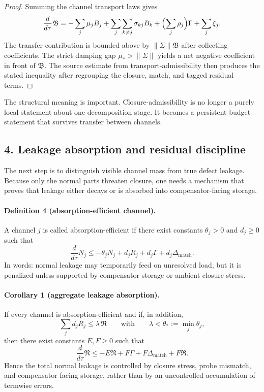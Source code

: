 \begin{proof}
Summing the channel transport laws gives
\[
\frac{d}{d\tau}\mathfrak B
= -\sum_j \mu_j B_j + \sum_j\sum_{k\neq j}\sigma_{kj}B_k
+ \Bigl(\sum_j \rho_j\Bigr)\Gamma + \sum_j \xi_j.
\]
The transfer contribution is bounded above by $\|\Sigma\|\mathfrak B$ after
collecting coefficients. The strict damping gap $\mu_*>\|\Sigma\|$ yields a net
negative coefficient in front of $\mathfrak B$. The source estimate from
transport-admissibility then produces the stated inequality after regrouping the
closure, match, and tagged residual terms.
\end{proof}

The structural meaning is important. Closure-admissibility is no longer a purely
local statement about one decomposition stage. It becomes a persistent budget
statement that survives transfer between channels.

\subsection*{4. Leakage absorption and residual discipline}
The next step is to distinguish visible channel mass from true defect leakage.
Because only the normal parts threaten closure, one needs a mechanism that proves
that leakage either decays or is absorbed into compensator-facing storage.

\paragraph{Definition 4 (absorption-efficient channel).}
A channel $j$ is called absorption-efficient if there exist constants
$\theta_j>0$ and $d_j\ge0$ such that
\[
\frac{d}{d\tau}N_j
\le -\theta_j N_j + d_j R_j + d_j\Gamma + d_j\Delta_{\mathrm{match}}.
\]
In words: normal leakage may temporarily feed on unresolved load, but it is
penalized unless supported by compensator storage or ambient closure stress.

\paragraph{Corollary 1 (aggregate leakage absorption).}
If every channel is absorption-efficient and if, in addition,
\[
\sum_j d_j R_j \le \lambda\,\mathfrak R
\qquad\text{with}\qquad
\lambda<\theta_*:=\min_j\theta_j,
\]
then there exist constants $E,F\ge0$ such that
\[
\frac{d}{d\tau}\mathfrak N
\le -E\mathfrak N + F\Gamma + F\Delta_{\mathrm{match}} + F\mathfrak R.
\]
Hence the total normal leakage is controlled by closure stress, probe mismatch,
and compensator-facing storage, rather than by an uncontrolled accumulation of
termwise errors.

